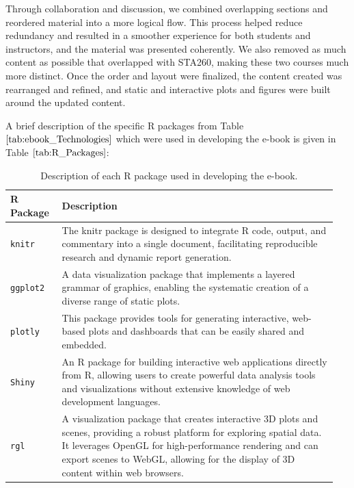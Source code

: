 \documentclass[11pt]{article}
\begin{document}
Through collaboration and discussion, we combined overlapping sections and reordered material into a more logical flow. This process helped reduce redundancy and resulted in a smoother experience for both students and instructors, and the material was presented coherently.
We also removed as much content as possible that overlapped with STA260, making these two courses much more distinct.
Once the order and layout were finalized, the content created was rearranged and refined, and static and interactive plots and figures were built around the updated content.

A brief description of the specific R packages from Table $\ref{tab:ebook_Technologies}$ which were used in developing the e-book is given in Table $\ref{tab:R_Packages}$:
\renewcommand\arraystretch{1.10}
\begin{table}[H]
\setlength{\belowcaptionskip}{-25pt}
\begin{center}
\begin{tabular}{| p{0.15\linewidth} | p{0.8\linewidth} |}
\hline
\textbf{R Package}	&	\textbf{Description}\\
\hline
\texttt{knitr}		&	The knitr package is designed to integrate R code, output, and commentary into a single document, facilitating reproducible research and dynamic report generation.\\
\hline
\texttt{ggplot2}		&	A data visualization package that implements a layered grammar of graphics, enabling the systematic creation of a diverse range of static plots.\\
\hline
\texttt{plotly}		&	This package provides tools for generating interactive, web-based plots and dashboards that can be easily shared and embedded.\\
\hline
\texttt{Shiny}		&	An R package for building interactive web applications directly from R, allowing users to create powerful data analysis tools and visualizations without extensive knowledge of web development languages.\\
\hline
\texttt{rgl}			&	A visualization package that creates interactive 3D plots and scenes, providing a robust platform for exploring spatial data. It leverages OpenGL for high-performance rendering and can export scenes to WebGL, allowing for the display of 3D content within web browsers.\\
\hline
\end{tabular}
\caption{Description of each R package used in developing the e-book.}
\label{tab:R_Packages}
\end{center}
\end{table}
\end{document}
